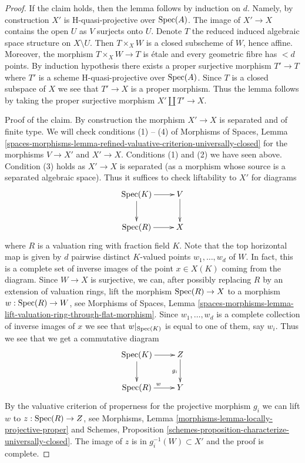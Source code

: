 \begin{proof}
\medskip\noindent
If the claim holds, then the lemma follows by induction on $d$.
Namely, by construction $X'$ is H-quasi-projective over $\mathop{\mathrm{Spec}}(A)$.
The image of $X' \to X$ contains the open $U$ as $V$ surjects onto $U$.
Denote $T$ the reduced induced algebraic space structure on $X \setminus U$.
Then $T \times_X W$ is a closed subscheme of $W$, hence affine.
Moreover, the morphism $T \times_X W \to T$ is \'etale and every geometric
fibre has $< d$ points. By induction hypothesis there exists a proper
surjective morphism $T' \to T$ where $T'$ is a scheme H-quasi-projective
over $\mathop{\mathrm{Spec}}(A)$. Since $T$ is a closed subspace of $X$ we see that
$T' \to X$ is a proper morphism. Thus the lemma follows by taking the
proper surjective morphism $X' \amalg T' \to X$.

\medskip\noindent
Proof of the claim. By construction the morphism $X' \to X$ is separated
and of finite type. We will check conditions (1) -- (4) of
Morphisms of Spaces, Lemma
\ref{spaces-morphisms-lemma-refined-valuative-criterion-universally-closed}
for the morphisms $V \to X'$ and $X' \to X$.
Conditions (1) and (2) we have seen above.
Condition (3) holds as $X' \to X$ is separated (as a morphism whose
source is a separated algebraic space). Thus it suffices to check
liftability to $X'$ for diagrams
$$
\xymatrix{
\Spec(K) \ar[r] \ar[d] & V \ar[d] \\
\Spec(R) \ar[r] & X
}
$$
where $R$ is a valuation ring with fraction field $K$.
Note that the top horizontal map is given by $d$ pairwise distinct
$K$-valued points $w_1, \ldots, w_d$ of $W$. In fact, this
is a complete set of inverse images of the point $x \in X(K)$
coming from the diagram. Since $W \to X$ is surjective,
we can, after possibly replacing $R$ by an extension of valuation rings,
lift the morphism $\mathop{\mathrm{Spec}}(R) \to X$ to a morphism $w : \mathop{\mathrm{Spec}}(R) \to W$, see
Morphisms of Spaces, Lemma
\ref{spaces-morphisms-lemma-lift-valuation-ring-through-flat-morphism}.
Since $w_1, \ldots, w_d$ is a complete collection of inverse images of
$x$ we see that $w|_{\mathop{\mathrm{Spec}}(K)}$ is equal to one of them, say $w_i$.
Thus we see that we get a commutative diagram
$$
\xymatrix{
\Spec(K) \ar[r] \ar[d] &  Z \ar[d]_{g_i}\\
\Spec(R) \ar[r]^w & Y
}
$$
By the valuative criterion of properness for the projective
morphism $g_i$ we can lift $w$ to $z : \mathop{\mathrm{Spec}}(R) \to Z$, see
Morphisms, Lemma \ref{morphisms-lemma-locally-projective-proper}
and
Schemes, Proposition \ref{schemes-proposition-characterize-universally-closed}.
The image of $z$ is in $g_i^{-1}(W) \subset X'$ and the proof is complete.
\end{proof}







